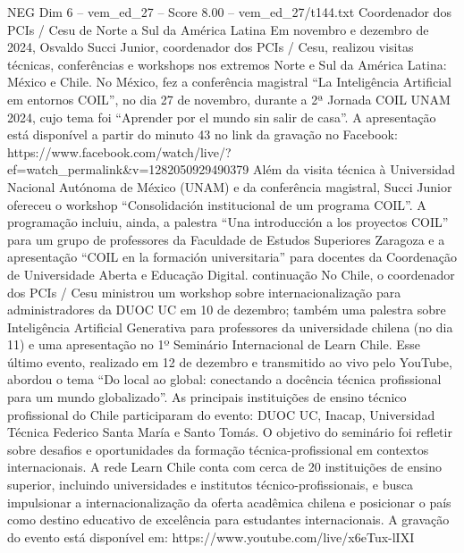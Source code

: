 \begin{textsample}{NEG Dim 6 – vem\_ed\_27 – Score 8.00 – vem\_ed\_27/t144.txt}  \label{ex:f6_neg_014}
Coordenador dos PCIs / Cesu de Norte a Sul da América Latina Em novembro e dezembro de 2024, Osvaldo Succi Junior, coordenador dos PCIs / Cesu, realizou visitas técnicas, conferências e workshops nos extremos Norte e Sul da América Latina: México e Chile.
No México, fez a conferência magistral “La Inteligência Artificial em entornos COIL”, no dia 27 de novembro, durante a 2ª Jornada COIL UNAM 2024, cujo tema foi “Aprender por el mundo sin salir de casa”.
A apresentação está disponível a partir do minuto 43 no link da gravação no Facebook: https://www.facebook.com/watch/live/?ef=watch\_permalink\&v=1282050929490379 Além da visita técnica à Universidad Nacional Autónoma de México (UNAM) e da conferência magistral, Succi Junior ofereceu o workshop “Consolidación institucional de um programa COIL”.
A programação incluiu, ainda, a palestra “Una introducción a los proyectos COIL” para um grupo de professores da Faculdade de Estudos Superiores Zaragoza e a apresentação “COIL en la formación universitaria” para docentes da Coordenação de Universidade Aberta e Educação Digital. continuação No Chile, o coordenador dos PCIs / Cesu ministrou um workshop sobre internacionalização para administradores da DUOC UC em 10 de dezembro; também uma palestra sobre Inteligência Artificial Generativa para professores da universidade chilena (no dia 11) e uma apresentação no 1º Seminário Internacional de Learn Chile.
Esse último evento, realizado em 12 de dezembro e transmitido ao vivo pelo YouTube, abordou o tema “Do local ao global: conectando a docência técnica profissional para um mundo globalizado”.
As principais instituições de ensino técnico profissional do Chile participaram do evento: DUOC UC, Inacap, Universidad Técnica Federico Santa María e Santo Tomás.
O objetivo do seminário foi refletir sobre desafios e oportunidades da formação técnica-profissional em contextos internacionais.
A rede Learn Chile conta com cerca de 20 instituições de ensino superior, incluindo universidades e institutos técnico-profissionais, e busca impulsionar a internacionalização da oferta acadêmica chilena e posicionar o país como destino educativo de excelência para estudantes internacionais.
A gravação do evento está disponível em: https://www.youtube.com/live/x6eTux-lIXI

\end{textsample}
